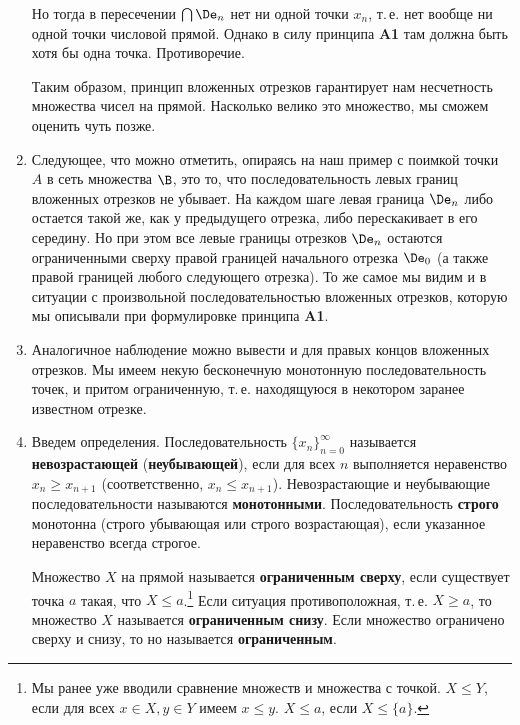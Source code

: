 \begin{enumerate}
Но тогда в пересечении $\bigcap\De_n$ нет ни одной точки $x_n$, т.\,е. нет вообще ни одной точки числовой прямой. Однако в силу принципа \textbf{A1} там должна быть хотя бы одна точка. Противоречие.

Таким образом, принцип вложенных отрезков гарантирует нам несчетность множества чисел на прямой. Насколько велико это множество, мы сможем оценить чуть позже.




\item Следующее, что можно отметить, опираясь на наш пример с поимкой точки $A$ в сеть множества $\B$, это то, что последовательность левых границ вложенных отрезков не убывает. На каждом шаге левая граница $\De_n$ либо остается такой же, как у предыдущего отрезка, либо перескакивает в его середину. Но при этом все левые границы отрезков $\De_n$ остаются ограниченными сверху правой границей начального отрезка $\De_0$ (а также правой границей любого следующего отрезка). То же самое мы видим и в ситуации с произвольной последовательностью вложенных отрезков, которую мы описывали при формулировке принципа \textbf{A1}.
\item Аналогичное наблюдение можно вывести и для правых концов вложенных отрезков. Мы имеем некую бесконечную монотонную последовательность точек, и притом ограниченную, т.\,е. находящуюся в некотором заранее известном отрезке.

\item Введем определения. Последовательность $\{x_n\}_{n=0}^\infty$ называется \textbf{невозрастающей} (\textbf{неубывающей}), если для всех $n$ выполняется неравенство $x_n\ge x_{n+1}$ (соответственно, $x_n\le x_{n+1}$). Невозрастающие и неубывающие последовательности называются \textbf{монотонными}. Последовательность \textbf{строго} монотонна (строго убывающая или строго возрастающая), если указанное неравенство всегда строгое.

Множество $X$ на прямой называется \textbf{ограниченным сверху}, если существует точка $a$ такая, что $X\le a$.\footnote{Мы ранее уже вводили сравнение множеств и множества с точкой. $X\le Y$, если для всех $x\in X,y\in Y$ имеем $x\le y$. $X\le a$, если $X\le\{a\}$. } Если ситуация противоположная, т.\,е. $X\ge a$, то множество $X$ называется \textbf{ограниченным снизу}. Если множество ограничено сверху и снизу, то но называется \textbf{ограниченным}.


\end{enumerate}
